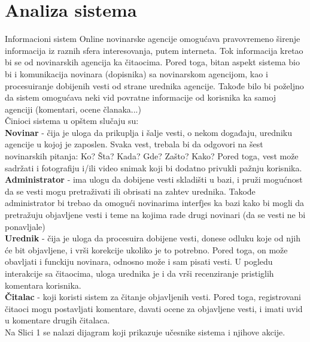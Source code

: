 \documentclass{article}
\begin{document}
\section{Analiza sistema}
Informacioni sistem Online novinarske agencije omogućava pravovremeno širenje informacija iz raznih sfera interesovanja, putem interneta. Tok informacija kretao bi se od novinarskih agencija ka čitaocima. Pored toga, bitan aspekt sistema bio bi i komunikacija novinara (dopisnika) sa novinarskom agencijom, kao i procesuiranje dobijenih vesti od strane urednika agencije. Takođe bilo bi poželjno da sistem omogućava neki vid povratne informacije od korisnika ka samoj agenciji (komentari, ocene članaka...)  \\
\indent Činioci sistema u opštem slučaju su: \\
\indent \textbf{Novinar} - čija je uloga da prikuplja i šalje vesti, o nekom događaju, uredniku agencije u kojoj je zaposlen. Svaka vest, trebala bi da odgovori na šest novinarskih pitanja: Ko? Šta? Kada? Gde? Zašto? Kako? Pored toga, vest može sadržati i fotografiju i/ili video snimak koji bi dodatno privukli pažnju korisnika. \\
\indent \textbf{Administrator} - ima ulogu da dobijene vesti skladišti u bazi, i pruži mogućnost da se vesti mogu pretraživati ili obrisati na zahtev urednika. Takođe administrator bi trebao da omogući novinarima interfjes ka bazi kako bi mogli da pretražuju objavljene vesti i teme na kojima rade drugi novinari (da se vesti ne bi ponavljale) \\
\indent \textbf{Urednik} - čija je uloga da procesuira dobijene vesti, donese odluku koje od njih će bit objavljene, i vrši korekcije ukoliko je to potrebno. Pored toga, on može obavljati i funckiju novinara, odnosno može i sam pisati vesti. U pogledu interakcije sa čitaocima, uloga urednika je i da vrši recenziranje pristiglih komentara korisnika. \\
\indent \textbf{Čitalac} - koji koristi sistem za čitanje objavljenih vesti. Pored toga, registrovani čitaoci mogu postavljati komentare, davati ocene za objavljene vesti, i imati uvid u komentare drugih čitalaca. 
\\
\indent Na Slici 1 se nalazi dijagram koji prikazuje učesnike sistema i njihove akcije.

\newpage
\end{document}
